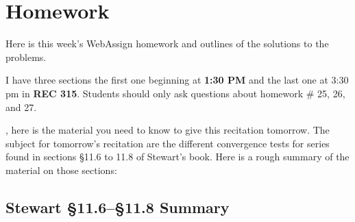 \chapter{Homework}
Here is this week's WebAssign homework and outlines of the solutions to the
problems.

I have three sections the first one beginning at \textbf{1:30 PM} and the
last one at 3:30 pm in \textbf{REC 315}. Students should only ask questions
about homework \# 25, 26, and 27.

\bigskip

, here is the material you need to know to give this
recitation tomorrow. The subject for tomorrow's recitation are the
different convergence tests for series found in sections \S 11.6
to 11.8 of Stewart's book. Here is a rough summary of the material on those
sections:
\section*{Stewart \S 11.6--\S 11.8 Summary}
